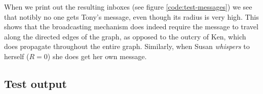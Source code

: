 
When we print out the resulting inboxes (see figure \ref{code:test-messages})
we see that notibly no one gets Tony's message, even though its radius is very
high. This shows that the broadcasting mechanism does indeed require the
message to travel along the directed edges of the graph, as opposed to the
outcry of Ken, which does propagate throughout the entire graph. Similarly,
when Susan {\it whispers} to herself ($R=0$) she does get her own message.



\subsection{Test output}
